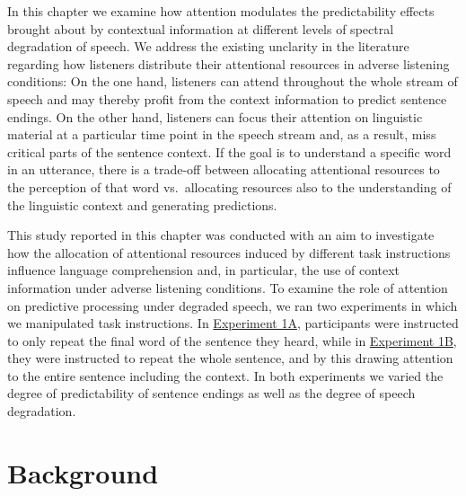\documentclass[a4paper, nobind]{templates/ociamthesis}
\begin{document}
In this chapter we examine how attention modulates the predictability effects brought about by contextual information at different levels of spectral degradation of speech.
We address the existing unclarity in the literature regarding how listeners distribute their attentional resources in adverse listening conditions:
On the one hand, listeners can attend throughout the whole stream of speech and may thereby profit from the context information to predict sentence endings.
On the other hand, listeners can focus their attention on linguistic material at a particular time point in the speech stream and, as a result, miss critical parts of the sentence context.
If the goal is to understand a specific word in an utterance, there is a trade-off between allocating attentional resources to the perception of that word vs.~allocating resources also to the understanding of the linguistic context and generating predictions.

This study reported in this chapter was conducted with an aim to investigate how the allocation of attentional resources induced by different task instructions influence language comprehension and, in particular, the use of context information under adverse listening conditions.
To examine the role of attention on predictive processing under degraded speech, we ran two experiments in which we manipulated task instructions.
In \protect\hyperlink{experiment1a}{Experiment 1A}, participants were instructed to only repeat the final word of the sentence they heard,
while in \protect\hyperlink{experiment1b}{Experiment 1B}, they were instructed to repeat the whole sentence, and by this drawing attention to the entire sentence including the context.
In both experiments we varied the degree of predictability of sentence endings as well as the degree of speech degradation.

\hypertarget{background}{%
\section{Background}\label{background}}
\end{document}
